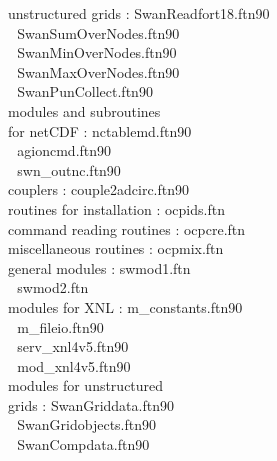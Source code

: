 \documentclass[12pt]{book}
\begin{document}
\begin{tabbing}
unstructured grids        \>:       SwanReadfort18.ftn90 \\
                          \> $\,\,$ SwanSumOverNodes.ftn90 \\
                          \> $\,\,$ SwanMinOverNodes.ftn90 \\
                          \> $\,\,$ SwanMaxOverNodes.ftn90 \\
                          \> $\,\,$ SwanPunCollect.ftn90 \\
modules and subroutines   \> $\,\,$ \\
for netCDF                \>:       nctablemd.ftn90 \\
                          \> $\,\,$ agioncmd.ftn90 \\
                          \> $\,\,$ swn\_outnc.ftn90 \\
couplers                  \>:       couple2adcirc.ftn90 \\
routines for installation \>:       ocpids.ftn \\
command reading routines  \>:       ocpcre.ftn \\
miscellaneous routines    \>:       ocpmix.ftn \\
general modules           \>:       swmod1.ftn \\
                          \> $\,\,$ swmod2.ftn \\
modules for XNL           \>:       m\_constants.ftn90 \\
                          \> $\,\,$ m\_fileio.ftn90 \\
                          \> $\,\,$ serv\_xnl4v5.ftn90 \\
                          \> $\,\,$ mod\_xnl4v5.ftn90 \\
modules for unstructured  \> $\,\,$ \\
grids                     \>:       SwanGriddata.ftn90 \\
                          \> $\,\,$ SwanGridobjects.ftn90 \\
                          \> $\,\,$ SwanCompdata.ftn90 \\
\end{tabbing}
\end{document}
